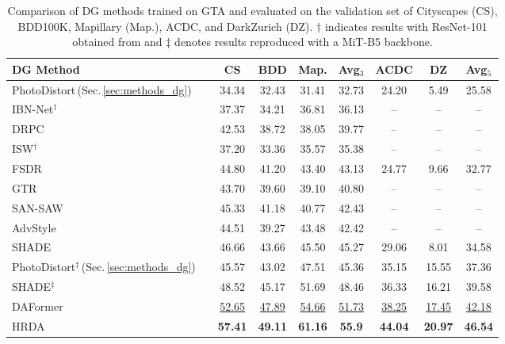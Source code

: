 \documentclass[journal,compsoc]{IEEEtran}
\begin{document}
\begin{table}
\centering
\caption{
Comparison of DG methods trained on GTA and evaluated on the validation set of Cityscapes (CS), BDD100K, Mapillary (Map.), ACDC, and DarkZurich (DZ). $\dagger$ indicates results with ResNet-101 obtained from \cite{zhao2022style} and $\ddagger$ denotes results reproduced with a MiT-B5 backbone.
}
\label{tab:sota_dg}
\setlength{\tabcolsep}{1.5pt}
\footnotesize
\begin{tabular}{l|c|cccc|ccc}
\toprule
DG Method & & CS & BDD & Map. & Avg$_3$ & ACDC & DZ & Avg$_5$\\
\midrule
PhotoDistort\,(Sec.\,\ref{sec:methods_dg}) & \parbox[t]{2mm}{} & 34.34 & 32.43 & 31.41 & 32.73 & 24.20 & 5.49 & 25.58\\
IBN-Net$^\dagger$~\cite{pan2018two} &  & 37.37 & 34.21 & 36.81 & 36.13 & -- & -- & --\\
DRPC~\cite{yue2019domain} &  & 42.53 & 38.72 & 38.05 & 39.77 & -- & -- & --\\
ISW$^\dagger$~\cite{choi2021robustnet} &  & 37.20 & 33.36 & 35.57 & 35.38 & -- & -- & --\\
FSDR~\cite{huang2021fsdr} &  & 44.80 & 41.20 & 43.40 & 43.13 & 24.77 & 9.66 & 32.77\\
GTR~\cite{peng2021global} &  & 43.70 & 39.60 & 39.10 & 40.80 & -- & -- & --\\
SAN-SAW~\cite{peng2022semantic} &  & 45.33 & 41.18 & 40.77 & 42.43 & -- & -- & --\\
AdvStyle~\cite{zhongadversarial} &  & 44.51 & 39.27 & 43.48 & 42.42 & -- & -- & --\\
SHADE~\cite{zhao2022style} &  & 46.66 & 43.66 & 45.50 & 45.27 & 29.06 & 8.01 & 34.58\\
\midrule
PhotoDistort$^\ddagger$\,(Sec.\,\ref{sec:methods_dg}) & \parbox[t]{2mm}{} & 45.57 & 43.02 & 47.51 & 45.36 & 35.15 & 15.55 & 37.36\\
SHADE$^\ddagger$~\cite{zhao2022style} &  & 48.52 & 45.17 & 51.69 & 48.46 & 36.33 & 16.21 & 39.58\\
DAFormer &  & \underline{52.65} & \underline{47.89} & \underline{54.66} & \underline{51.73} & \underline{38.25} & \underline{17.45} & \underline{42.18}\\
HRDA &  & \textbf{57.41} & \textbf{49.11} & \textbf{61.16} & \textbf{55.9} & \textbf{44.04} & \textbf{20.97} & \textbf{46.54}\\

\bottomrule
\end{tabular}
\end{table}
 
\end{document}
